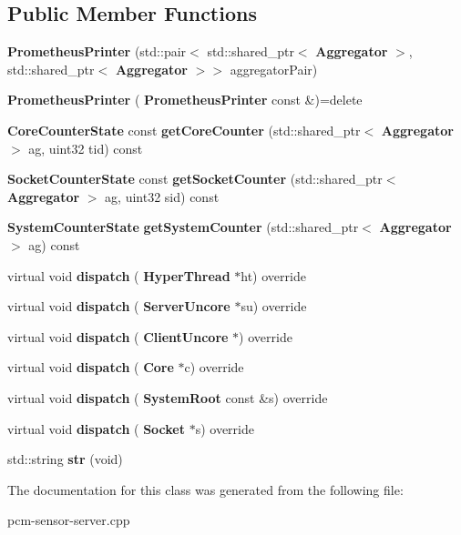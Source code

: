 \subsection*{Public Member Functions}
\begin{DoxyCompactItemize}
\item 
\mbox{\label{classPrometheusPrinter_a85eb3356b67193c9714c1bd1f4bc4ad2}} 
{\bfseries Prometheus\+Printer} (std\+::pair$<$ std\+::shared\+\_\+ptr$<$ \textbf{ Aggregator} $>$, std\+::shared\+\_\+ptr$<$ \textbf{ Aggregator} $>$$>$ aggregator\+Pair)
\item 
\mbox{\label{classPrometheusPrinter_a86806f1980b42bd57d908df77924b6ec}} 
{\bfseries Prometheus\+Printer} (\textbf{ Prometheus\+Printer} const \&)=delete
\item 
\mbox{\label{classPrometheusPrinter_a5cb2e0139b2af4a0e91a0a5801700f86}} 
\textbf{ Core\+Counter\+State} const {\bfseries get\+Core\+Counter} (std\+::shared\+\_\+ptr$<$ \textbf{ Aggregator} $>$ ag, uint32 tid) const
\item 
\mbox{\label{classPrometheusPrinter_a0f34e07c9a80072007692374ef9685d5}} 
\textbf{ Socket\+Counter\+State} const {\bfseries get\+Socket\+Counter} (std\+::shared\+\_\+ptr$<$ \textbf{ Aggregator} $>$ ag, uint32 sid) const
\item 
\mbox{\label{classPrometheusPrinter_a2a816b35e66608bb0b070d65779ba95d}} 
\textbf{ System\+Counter\+State} {\bfseries get\+System\+Counter} (std\+::shared\+\_\+ptr$<$ \textbf{ Aggregator} $>$ ag) const
\item 
\mbox{\label{classPrometheusPrinter_a308802af34c359bbabcc49e1a0b4437c}} 
virtual void {\bfseries dispatch} (\textbf{ Hyper\+Thread} $\ast$ht) override
\item 
\mbox{\label{classPrometheusPrinter_a0b1a6a92c5563dcf178f5b14f22a8471}} 
virtual void {\bfseries dispatch} (\textbf{ Server\+Uncore} $\ast$su) override
\item 
\mbox{\label{classPrometheusPrinter_ab83e697dbcec6f5694a86895052e99fc}} 
virtual void {\bfseries dispatch} (\textbf{ Client\+Uncore} $\ast$) override
\item 
\mbox{\label{classPrometheusPrinter_a49efcb7a91b8cd0e20d2b33e16fa3297}} 
virtual void {\bfseries dispatch} (\textbf{ Core} $\ast$c) override
\item 
\mbox{\label{classPrometheusPrinter_af6d1d73077dc085ab9f88b1dc0504737}} 
virtual void {\bfseries dispatch} (\textbf{ System\+Root} const \&s) override
\item 
\mbox{\label{classPrometheusPrinter_af304300a3c0be16d89df4c3597334cff}} 
virtual void {\bfseries dispatch} (\textbf{ Socket} $\ast$s) override
\item 
\mbox{\label{classPrometheusPrinter_ab791e0389bdea71bf0be5fae84906d85}} 
std\+::string {\bfseries str} (void)
\end{DoxyCompactItemize}


The documentation for this class was generated from the following file\+:\begin{DoxyCompactItemize}
\item 
pcm-\/sensor-\/server.\+cpp\end{DoxyCompactItemize}
